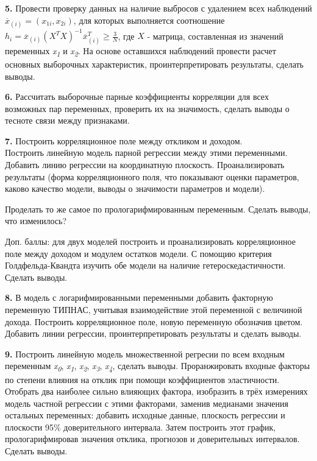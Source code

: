 \documentclass[
]{book}
\begin{document}
\textbf{5.} Провести проверку данных на наличие выбросов с удалением всех наблюдений \(\overline{x}_{(i)}=(x_{1i},x_{2i})\), для которых выполняется соотношение \(h_{i}=\overline{x}_{(i)}(X^{T}X)^{-1}\overline{x}_{(i)}^{T}\geqslant \frac{3}{N}\), где \(X\) - матрица, составленная из значений переменных \emph{x}\textsubscript{\emph{1}} и \emph{x}\textsubscript{\emph{2}}. На основе оставшихся наблюдений провести расчет основных выборочных характеристик, проинтерпретировать результаты, сделать выводы.

\textbf{6.} Рассчитать выборочные парные коэффициенты корреляции для всех возможных пар переменных, проверить их на значимость, сделать выводы о тесноте связи между признаками.

\textbf{7.} Построить корреляционное поле между откликом и доходом.\\
Построить линейную модель парной регрессии между этими переменными. Добавить линию регрессии на координатную плоскость. Проанализировать результаты (форма корреляционного поля, что показывают оценки параметров, каково качество модели, выводы о значимости параметров и модели).

Проделать то же самое по прологарифмированным переменным. Сделать выводы, что изменилось?

Доп. баллы: для двух моделей построить и проанализировать корреляционное поле между доходом и модулем остатков модели. С помощию критерия Голдфельда-Квандта изучить обе модели на наличие гетероскедастичности. Сделать выводы.

\textbf{8.} В модель с логарифмированными переменными добавить факторную переменную ТИПНАС, учитывая взаимодействие этой переменной с величиной дохода. Построить корреляционное поле, новую переменную обозначив цветом. Добавить линии регрессии, проинтерпретировать результаты и сделать выводы.

\textbf{9.} Построить линейную модель множественной регресии по всем входным переменным \emph{x}\textsubscript{\emph{0}}, \emph{x}\textsubscript{\emph{1}}, \emph{x}\textsubscript{\emph{2}}, \emph{x}\textsubscript{\emph{3}}, \emph{x}\textsubscript{\emph{4}}, сделать выводы. Проранжировать входные факторы по степени влияния на отклик при помощи коэффициентов эластичности. Отобрать два наиболее сильно влияющих фактора, изобразить в трёх измерениях модель частной регрессии с этими факторами, заменив медианами значения остальных переменных: добавить исходные данные, плоскость регрессии и плоскости 95\% доверительного интервала. Затем построить этот график, прологарифмировав значения отклика, прогнозов и доверительных интервалов. Сделать выводы.
\end{document}
